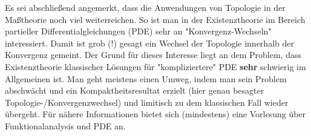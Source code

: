 \documentclass[11pt,english]{smfart}
\begin{document}
Es sei abschließend angemerkt, dass die Anwendungen von Topologie in der Maßtheorie noch viel weiterreichen. So ist man in der Existenztheorie im Bereich partieller Differentialgleichungen (PDE) sehr an "Konvergenz-Wechseln" interessiert. Damit ist grob (!) gesagt ein Wechsel der Topologie innerhalb der Konvergenz gemeint. Der Grund für dieses Interesse liegt an dem Problem, dass Existenztheorie klassischer Lösungen für "kompliziertere" PDE \textbf{sehr} schwierig im Allgemeinen ist. Man geht meistens einen Umweg, indem man sein Problem abschwächt und ein Kompaktheitsresultat erzielt (hier genau besagter Topologie-/Konvergenzwechsel) und limitisch zu dem klassischen Fall wieder übergeht. Für nähere Informationen bietet sich (mindestens) eine Vorlesung über Funktionalanalysis und PDE an.
\end{document}
